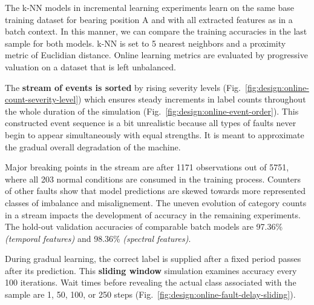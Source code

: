 The k-NN models in incremental learning experiments learn on the same base training dataset for bearing position A and with all extracted features as in a batch context. In this manner, we can compare the training accuracies in the last sample for both models. k-NN is set to 5 nearest neighbors and a proximity metric of Euclidian distance. Online learning metrics are evaluated by progressive valuation on a dataset that is left unbalanced.

The \textbf{stream of events is sorted} by rising severity levels (Fig.~\ref{fig:design:online-count-severity-level}) which ensures steady increments in label counts throughout the whole duration of the simulation (Fig.~\ref{fig:design:online-event-order}). This constructed event sequence is a bit unrealistic because all types of faults never begin to appear simultaneously with equal strengths. It is meant to approximate the gradual overall degradation of the machine.


Major breaking points in the stream are after 1171 observations out of 5751, where all 203 normal conditions are consumed in the training process. Counters of other faults show that model predictions are skewed towards more represented classes of imbalance and misalignement. The uneven evolution of category counts in a stream impacts the development of accuracy in the remaining experiments. The hold-out validation accuracies of comparable batch models are 97.36\% \emph{(temporal features)} and 98.36\% \emph{(spectral features)}.
	
During gradual learning, the correct label is supplied after a fixed period passes after its prediction. This \textbf{sliding window} simulation examines accuracy every 100 iterations. Wait times before revealing the actual class associated with the sample are 1, 50, 100, or 250 steps (Fig.~\ref{fig:design:online-fault-delay-sliding}). 


